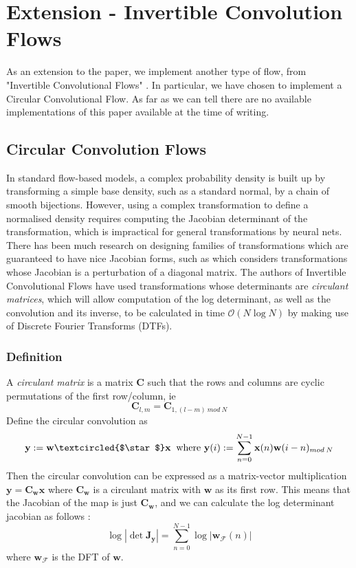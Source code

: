 \chapter{Extension - Invertible Convolution Flows}

As an extension to the paper, we implement another type of flow, from "Invertible Convolutional Flows" \cite{conv_flow}. In particular, we have chosen to implement a Circular Convolutional Flow. As far as we can tell there are no available implementations of this paper available at the time of writing.

\section{Circular Convolution Flows}
In standard flow-based models, a complex probability density is built up by transforming a simple base density, such as a standard normal, by a chain of smooth bijections. However, using a complex transformation to define a normalised density requires computing the Jacobian determinant of the transformation, which is impractical for general transformations by neural nets. There has been much research on designing families of transformations which are guaranteed to have nice Jacobian forms, such as \cite{main} which considers transformations whose Jacobian is a perturbation of a diagonal matrix. The authors of Invertible Convolutional Flows have used transformations whose determinants are \textit{circulant matrices}, which will allow computation of the log determinant, as well as the convolution and its inverse, to be calculated in time $\mathcal{O}(N \log N)$ by making use of Discrete Fourier Transforms (DTFs).

\subsection{Definition}
A \textit{circulant matrix} is a matrix $\mathbf{C}$ such that the rows and columns are cyclic permutations of the first row/column, ie
\begin{equation}
	\mathbf{C}_{l,m} = \mathbf{C}_{1,(l-m) \: mod \: N}
\end{equation}
Define the circular convolution as
\begin{equation}
	\mathbf{y} := \mathbf{w} \textcircled{$\star$} \mathbf{x} \;\; \text{where } \mathbf{y}(i) := \sum_{n=0}^{N-1} \mathbf{x}(n)\mathbf{w}(i-n)_{mod\:N}
\end{equation}
Then the circular convolution can be expressed as a matrix-vector multiplication $\mathbf{y} = \mathbf{C_w x}$ where $\mathbf{C_w}$ is a circulant matrix with $\mathbf{w}$ as its first row. This means that the Jacobian of the map is just $\mathbf{C_w}$, and we can calculate the log determinant jacobian as follows \cite{gray}:
\begin{equation}
	\log |\det \mathbf{J_y}| = \sum_{n=0}^{N-1} \log |\mathbf{w_\mathcal{F}}(n)|
\end{equation}
where $\mathbf{w_\mathcal{F}}$ is the DFT of $\mathbf{w}$.

